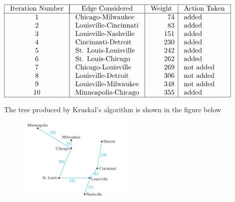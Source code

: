 \documentclass{report}
\begin{document}
\begin{center}
$ \begin{array}{|c|l|r|l|}
\hline \text { Iteration Number } & \multicolumn{1}{|c|}{\text { Edge Considered }} & \text { Weight } & \text { Action Taken } \\
\hline 1 & \text { Chicago-Milwaukee } & 74 & \text { added } \\
2 & \text { Louisville-Cincinnati } & 83 & \text { added } \\
3 & \text { Louisville-Nashville } & 151 & \text { added } \\
4 & \text { Cincinnati-Detroit } & 230 & \text { added } \\
5 & \text { St. Louis-Louisville } & 242 & \text { added } \\
6 & \text { St. Louis-Chicago } & 262 & \text { added } \\
7 & \text { Chicago-Louisville } & 269 & \text { not added } \\
8 & \text { Louisville-Detroit } & 306 & \text { not added } \\
9 & \text { Louisville-Milwaukee } & 348 & \text { not added } \\
10 & \text { Minneapolis-Chicago } & 355 & \text { added } \\
\hline
\end{array}$
\end{center}
\bigbreak \noindent \bigbreak \noindent
The tree produced by Kruskal's algorithm is shown in the figure below
\begin{figure}[ht]
\centering
\includegraphics[width=0.5\textwidth]{ kru.png }
\caption{}
\end{figure}
\end{document}
